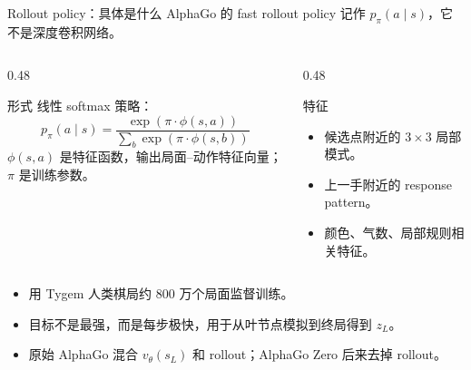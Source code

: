 \documentclass[UTF8,aspectratio=169,10pt]{ctexbeamer}
\begin{document}
\begin{frame}{Rollout policy：具体是什么}
  AlphaGo 的 fast rollout policy 记作 $p_{\pi}(a\mid s)$，它不是深度卷积网络。

  \vspace{0.08cm}
  \begin{columns}[T,onlytextwidth]
    \begin{column}{0.48\textwidth}
      \begin{block}{形式}
        线性 softmax 策略：
        \[
          p_{\pi}(a\mid s)=
          \frac{\exp(\pi\cdot\phi(s,a))}
               {\sum_b \exp(\pi\cdot\phi(s,b))}
        \]
        \footnotesize
        $\phi(s,a)$ 是特征函数，输出局面--动作特征向量；$\pi$ 是训练参数。
      \end{block}
    \end{column}
    \begin{column}{0.48\textwidth}
      \begin{block}{特征}
        \begin{itemize}
          \item 候选点附近的 $3\times3$ 局部模式。
          \item 上一手附近的 response pattern。
          \item 颜色、气数、局部规则相关特征。
        \end{itemize}
      \end{block}
    \end{column}
  \end{columns}

  \vspace{0.14cm}
  \begin{itemize}
    \item 用 Tygem 人类棋局约 800 万个局面监督训练。
    \item 目标不是最强，而是每步极快，用于从叶节点模拟到终局得到 $z_L$。
    \item 原始 AlphaGo 混合 $v_{\theta}(s_L)$ 和 rollout；AlphaGo Zero 后来去掉 rollout。
  \end{itemize}
\end{frame}
\end{document}
